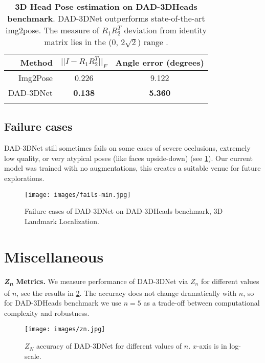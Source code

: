 \documentclass[10pt,twocolumn,letterpaper]{article}
\begin{document}
\begin{table}[t]
\footnotesize
\renewcommand{\arraystretch}{0.95}
\centering
\begin{tabular}{r|c|c}
\noalign{\smallskip}
Method & $||I-R_1 R_2^{T}||_F$ & Angle error (degrees)\\
\hline
Img2Pose \cite{img2pose} & 0.226  & 9.122  \\
DAD-3DNet & \textbf{0.138} & \textbf{5.360} \\ 
\noalign{\smallskip}
\end{tabular}
\caption{\textbf{3D Head Pose estimation on DAD-3DHeads benchmark}. DAD-3DNet outperforms state-of-the-art img2pose\cite{img2pose}. The measure of $R_1 R_2^{T}$ deviation from identity matrix lies in the (0, $2\sqrt{2}$) range \cite{rot_matrix_metrics}.}
\label{t:3dpose_img2pose_we}
\end{table}
 
\subsection{Failure cases}
DAD-3DNet still sometimes fails on some cases of severe occlusions, extremely low quality, or very atypical poses (like faces upside-down) (see \cref{fig:fails-lnmd}). Our current model was trained with no augmentations, this creates a suitable venue for future explorations.

\begin{figure}[h]\centering
\texttt{[image: images/fails-min.jpg]}
  \caption{Failure cases of DAD-3DNet on DAD-3DHeads benchmark, 3D Landmark Localization.}
  \vspace{-1em}
  \label{fig:fails-lnmd}
\end{figure}






\section{Miscellaneous}

\textbf{\textit{Z\textsubscript{n}} Metrics.}
We measure performance of DAD-3DNet via $Z_n$ for different values of $n$, see the results in \cref{fig:z5}. The accuracy does not change dramatically with $n$, so for DAD-3DHeads benchmark we use $n=5$ as a trade-off between computational complexity and robustness.

\begin{figure}[h]\centering
\texttt{[image: images/zn.jpg]}
  \caption{$Z_N$ accuracy of DAD-3DNet for different values of $n$. $x$-axis is in log-scale.}
  \vspace{-1em}
  \label{fig:z5}
\end{figure}
\end{document}
